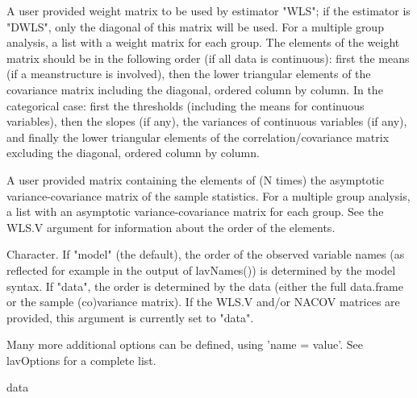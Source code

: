 \documentclass[a4paper]{book}
\begin{document}
\begin{Arguments}
\begin{ldescription}
\item[\code{WLS.V}] A user provided weight matrix to be used by estimator "WLS";
if the estimator is "DWLS", only the diagonal of this matrix will be used.
For a multiple group analysis, a list with a weight matrix for each group.
The elements of the weight matrix should be in the following order (if all data is
continuous): first the means (if a meanstructure is involved),
then the lower triangular elements of the covariance matrix including the
diagonal, ordered column by column. In the categorical case: first
the thresholds (including the means for continuous variables),
then the slopes (if any), the variances of continuous variables (if any),
and finally the lower triangular elements of the correlation/covariance
matrix excluding the diagonal, ordered column by column.

\item[\code{NACOV}] A user provided matrix containing the elements of (N times)
the asymptotic variance-covariance matrix of the sample statistics.
For a multiple group analysis, a list with an asymptotic variance-covariance
matrix for each group. See the WLS.V argument for information about
the order of the elements.

\item[\code{ov.order}] Character. If "model" (the default), the order of the observed
variable names (as reflected for example in the output of lavNames())
is determined by the model syntax. If "data", the order is determined
by the data (either the full data.frame or the sample (co)variance matrix).
If the WLS.V and/or NACOV matrices are provided,
this argument is currently set to "data".

\item[\code{...}] Many more additional options can be defined, using 'name = value'. See lavOptions for a complete list.
\end{ldescription}
\end{Arguments}
%
\begin{Value}
data
\end{Value}
%
\end{document}
